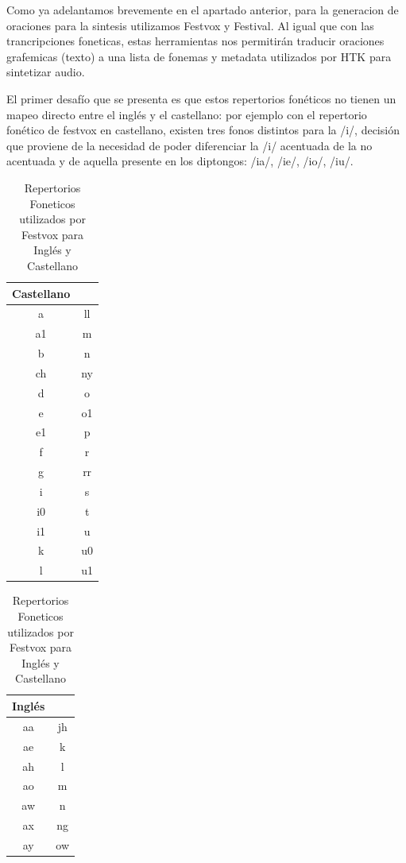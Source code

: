 
Como ya adelantamos brevemente en el apartado anterior, para la generacion de oraciones para la sintesis utilizamos Festvox y Festival. Al igual que con las trancripciones foneticas, estas herramientas nos permitirán traducir oraciones grafemicas (texto) a una lista de fonemas y metadata utilizados por HTK para sintetizar audio.

El primer desafío que se presenta es que estos repertorios fonéticos no tienen un mapeo directo entre el inglés y el castellano: por ejemplo con el repertorio fonético de festvox en castellano, existen tres fonos distintos para la /i/, decisión que proviene de la necesidad de poder diferenciar la /i/ acentuada de la no acentuada  y de aquella presente en los diptongos: /ia/, /ie/, /io/, /iu/.

\begin{table}
\centering
\caption{Repertorios Foneticos utilizados por Festvox para Inglés y Castellano}
\begin{minipage}[t]{0.3\textwidth}
\begin{tabular}[t]{cc}
\toprule
Castellano \\
\midrule
a & ll \\
a1&  m  \\
b & n  \\
ch&  ny \\
d & o  \\
e & o1 \\
e1&  p  \\
f & r  \\
g & rr \\
i & s  \\
i0&  t  \\
i1&  u  \\
k & u0 \\
l & u1 \\
\bottomrule
\end{tabular}
\end{minipage}
\begin{minipage}[t]{0.3\textwidth}
\begin{tabular}[t]{cc}
\toprule
Inglés \\ 
\midrule
 aa & jh\\
 ae & k \\
 ah & l \\
 ao & m \\
 aw & n \\
 ax & ng\\
 ay & ow\\

\end{tabular}
\end{minipage}
\end{table}
